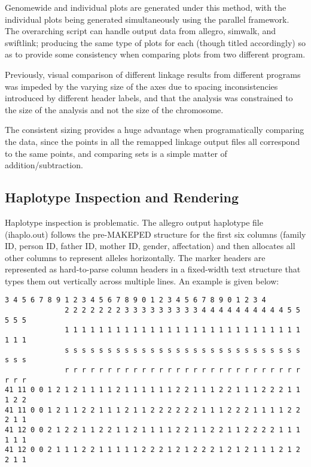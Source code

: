 Genomewide and individual plots are generated under this method, with the individual plots being generated simultaneously using the parallel framework. The overarching script can handle output data from allegro, simwalk, and swiftlink; producing the same type of plots for each (though titled accordingly) so as to provide some consistency when comparing plots from two different program.

Previously, visual comparison of different linkage results from different programs was impeded by the varying size of the axes due to spacing inconsistencies introduced by different header labels, and that the analysis was constrained to the size of the analysis and not the size of the chromosome.

The consistent sizing provides a huge advantage when programatically comparing the data, since the points in all the remapped linkage output files all correspond to the same points, and comparing sets is a simple matter of addition/subtraction.


\subsection{Haplotype Inspection and Rendering}

Haplotype inspection is problematic. The allegro output haplotype file (ihaplo.out) follows the pre-MAKEPED structure for the first six columns (family ID, person ID, father ID, mother ID, gender, affectation) and then allocates all other columns to represent alleles horizontally. The marker headers are represented as hard-to-parse column headers in a fixed-width text structure that types them out vertically across multiple lines. An example is given below:

\begingroup
\begin{spacing}{1}
\begin{lstlisting}[label=verb:inhaplo]
              3 4 5 6 7 8 9 1 2 3 4 5 6 7 8 9 0 1 2 3 4 5 6 7 8 9 0 1 2 3 4
              2 2 2 2 2 2 2 3 3 3 3 3 3 3 3 3 4 4 4 4 4 4 4 4 4 4 5 5 5 5 5
              1 1 1 1 1 1 1 1 1 1 1 1 1 1 1 1 1 1 1 1 1 1 1 1 1 1 1 1 1 1 1
              s s s s s s s s s s s s s s s s s s s s s s s s s s s s s s s
              r r r r r r r r r r r r r r r r r r r r r r r r r r r r r r r
41 11 0 0 1 2 1 2 1 1 1 1 2 1 1 1 1 1 1 2 2 1 1 1 2 2 1 1 1 2 2 2 1 1 1 2 2
41 11 0 0 1 2 1 1 2 2 1 1 1 2 1 1 2 2 2 2 2 2 1 1 1 2 2 2 1 1 1 1 2 2 2 1 1
41 12 0 0 2 1 2 2 1 1 2 2 1 1 2 1 1 1 1 2 2 1 1 2 2 1 1 2 2 2 2 1 1 1 1 1 1
41 12 0 0 2 1 1 1 2 2 1 1 1 1 1 2 2 2 1 2 1 2 2 2 1 2 1 2 1 1 1 2 1 2 2 1 1
\end{lstlisting}
\vspace{-9pt}
\end{spacing}
\endgroup
\vspace{10pt}

